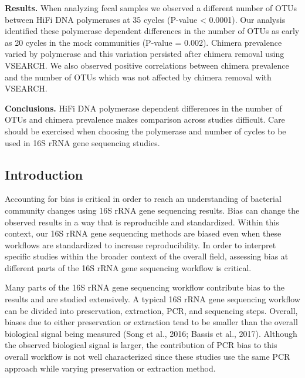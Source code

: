 \documentclass[12pt,]{article}
\begin{document}
\textbf{Results.} When analyzing fecal samples we observed a different
number of OTUs between HiFi DNA polymerases at 35 cycles (P-value
\textless{} 0.0001). Our analysis identified these polymerase dependent
differences in the number of OTUs as early as 20 cycles in the mock
communities (P-value = 0.002). Chimera prevalence varied by polymerase
and this variation persisted after chimera removal using VSEARCH. We
also observed positive correlations between chimera prevalence and the
number of OTUs which was not affected by chimera removal with VSEARCH.

\textbf{Conclusions.} HiFi DNA polymerase dependent differences in the
number of OTUs and chimera prevalence makes comparison across studies
difficult. Care should be exercised when choosing the polymerase and
number of cycles to be used in 16S rRNA gene sequencing studies.

\newpage

\subsection{Introduction}\label{introduction}

Accounting for bias is critical in order to reach an understanding of
bacterial community changes using 16S rRNA gene sequencing results. Bias
can change the observed results in a way that is reproducible and
standardized. Within this context, our 16S rRNA gene sequencing methods
are biased even when these workflows are standardized to increase
reproducibility. In order to interpret specific studies within the
broader context of the overall field, assessing bias at different parts
of the 16S rRNA gene sequencing workflow is critical.

Many parts of the 16S rRNA gene sequencing workflow contribute bias to
the results and are studied extensively. A typical 16S rRNA gene
sequencing workflow can be divided into preservation, extraction, PCR,
and sequencing steps. Overall, biases due to either preservation or
extraction tend to be smaller than the overall biological signal being
measured (Song et al., 2016; Bassis et al., 2017). Although the observed
biological signal is larger, the contribution of PCR bias to this
overall workflow is not well characterized since these studies use the
same PCR approach while varying preservation or extraction method.
\end{document}
